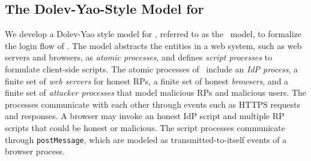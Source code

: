 


\subsection{The Dolev-Yao-Style Model for \usso}
\label{dy-model}

We develop a Dolev-Yao style model \cite{BrowserID, SPRESSO, FettKS16, FettKS17} for \usso, referred to as the \dyu~model, to formalize the login flow of \usso.
The model abstracts the entities in a web system, such as web servers and browsers, as \emph{atomic processes}, %
and defines \emph{script processes} to formulate client-side scripts.
The atomic processes of \usso~include an {\em IdP process}, a finite set of {\em web servers} for honest RPs, a finite set of honest {\em browsers}, and a finite set of {\em attacker processes} that model malicious RPs and malicious users.
The processes communicate with each other through events such as HTTPS requests and responses. A browser may invoke an honest IdP script and multiple RP scripts that could be honest or malicious.
The script processes communicate through \verb+postMessage+, which are modeled as transmitted-to-itself events of a browser process.

